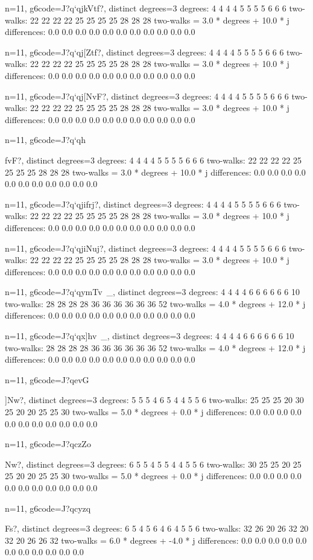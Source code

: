 {{{{{{{{{{{{{{{{{{n=11, g6code=J?q`qjkVtf?, distinct degrees=3
degrees: 4 4 4 4 5 5 5 5 6 6 6 
two-walks: 22 22 22 22 25 25 25 25 28 28 28 
two-walks = 3.0 * degrees + 10.0 * j
differences: 0.0 0.0 0.0 0.0 0.0 0.0 0.0 0.0 0.0 0.0 0.0 

n=11, g6code=J?q`qj[Ztf?, distinct degrees=3
degrees: 4 4 4 4 5 5 5 5 6 6 6 
two-walks: 22 22 22 22 25 25 25 25 28 28 28 
two-walks = 3.0 * degrees + 10.0 * j
differences: 0.0 0.0 0.0 0.0 0.0 0.0 0.0 0.0 0.0 0.0 0.0 

n=11, g6code=J?q`qj[NvF?, distinct degrees=3
degrees: 4 4 4 4 5 5 5 5 6 6 6 
two-walks: 22 22 22 22 25 25 25 25 28 28 28 
two-walks = 3.0 * degrees + 10.0 * j
differences: 0.0 0.0 0.0 0.0 0.0 0.0 0.0 0.0 0.0 0.0 0.0 

n=11, g6code=J?q`qh{fvF?, distinct degrees=3
degrees: 4 4 4 4 5 5 5 5 6 6 6 
two-walks: 22 22 22 22 25 25 25 25 28 28 28 
two-walks = 3.0 * degrees + 10.0 * j
differences: 0.0 0.0 0.0 0.0 0.0 0.0 0.0 0.0 0.0 0.0 0.0 

n=11, g6code=J?q`qjifrj?, distinct degrees=3
degrees: 4 4 4 4 5 5 5 5 6 6 6 
two-walks: 22 22 22 22 25 25 25 25 28 28 28 
two-walks = 3.0 * degrees + 10.0 * j
differences: 0.0 0.0 0.0 0.0 0.0 0.0 0.0 0.0 0.0 0.0 0.0 

n=11, g6code=J?q`qjiNuj?, distinct degrees=3
degrees: 4 4 4 4 5 5 5 5 6 6 6 
two-walks: 22 22 22 22 25 25 25 25 28 28 28 
two-walks = 3.0 * degrees + 10.0 * j
differences: 0.0 0.0 0.0 0.0 0.0 0.0 0.0 0.0 0.0 0.0 0.0 

n=11, g6code=J?q`qymTv~_, distinct degrees=3
degrees: 4 4 4 4 6 6 6 6 6 6 10 
two-walks: 28 28 28 28 36 36 36 36 36 36 52 
two-walks = 4.0 * degrees + 12.0 * j
differences: 0.0 0.0 0.0 0.0 0.0 0.0 0.0 0.0 0.0 0.0 0.0 

n=11, g6code=J?q`qx]hv~_, distinct degrees=3
degrees: 4 4 4 4 6 6 6 6 6 6 10 
two-walks: 28 28 28 28 36 36 36 36 36 36 52 
two-walks = 4.0 * degrees + 12.0 * j
differences: 0.0 0.0 0.0 0.0 0.0 0.0 0.0 0.0 0.0 0.0 0.0 

n=11, g6code=J?qevG{]Nw?, distinct degrees=3
degrees: 5 5 5 4 6 5 4 4 5 5 6 
two-walks: 25 25 25 20 30 25 20 20 25 25 30 
two-walks = 5.0 * degrees + 0.0 * j
differences: 0.0 0.0 0.0 0.0 0.0 0.0 0.0 0.0 0.0 0.0 0.0 

n=11, g6code=J?qczZo{Nw?, distinct degrees=3
degrees: 6 5 5 4 5 5 4 4 5 5 6 
two-walks: 30 25 25 20 25 25 20 20 25 25 30 
two-walks = 5.0 * degrees + 0.0 * j
differences: 0.0 0.0 0.0 0.0 0.0 0.0 0.0 0.0 0.0 0.0 0.0 

n=11, g6code=J?qcyzq}Fs?, distinct degrees=3
degrees: 6 5 4 5 6 4 6 4 5 5 6 
two-walks: 32 26 20 26 32 20 32 20 26 26 32 
two-walks = 6.0 * degrees + -4.0 * j
differences: 0.0 0.0 0.0 0.0 0.0 0.0 0.0 0.0 0.0 0.0 0.0 

}}}}}}}}}}}}}}}}}}}}
